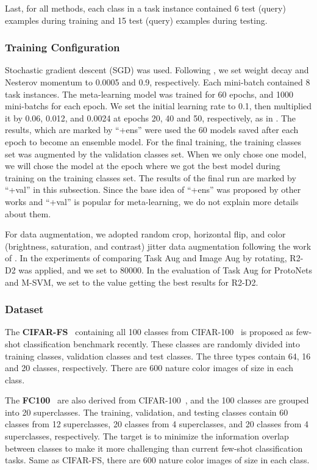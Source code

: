 \documentclass[10pt,twocolumn,letterpaper]{article}
\begin{document}
Last, for all methods, each class in a task instance contained 6 test (query) examples during training and 15 test (query) examples during testing.

\subsubsection{Training Configuration}
Stochastic gradient descent (SGD) was used. Following \cite{sutskever2013importance}, we set weight decay and Nesterov momentum to 0.0005 and 0.9, respectively. Each mini-batch contained 8 task instances. The meta-learning model was trained for 60 epochs, and 1000 mini-batchs for each epoch. We set the initial learning rate to 0.1, then multiplied it by 0.06, 0.012, and 0.0024 at epochs 20, 40 and 50, respectively, as in \cite{gidaris2018dynamic}. The results, which are marked by ``+ens'' were used the 60 models saved after each epoch to become an ensemble model. For the final training, the training classes set was augmented by the validation classes set. When we only chose one model, we will chose the model at the epoch where we got the best model during training on the training classes set. The results of the final run are marked by ``+val'' in this subsection. Since the base idea of ``+ens'' was proposed by other works and ``+val'' is popular for meta-learning, we do not explain more details about them.

For data augmentation, we adopted random crop, horizontal flip, and color (brightness, saturation, and contrast) jitter data augmentation following the work of \cite{gidaris2018dynamic,qiao2018few}. In the experiments of comparing Task Aug and Image Aug by rotating, R2-D2 was applied, and we set  to 80000. In the evaluation of Task Aug for ProtoNets and M-SVM, we set  to the value getting the best results for R2-D2.



\subsubsection{Dataset}
The \textbf{CIFAR-FS}~\cite{bertinetto2018meta} containing all 100 classes from CIFAR-100~\cite{krizhevsky2010cifar} is proposed as few-shot classification benchmark recently. These classes are randomly divided into training classes, validation classes and test classes. The three types contain 64, 16 and 20 classes, respectively. There are 600 nature color images of size  in each class.

The \textbf{FC100}~\cite{oreshkin2018tadam} are also derived from CIFAR-100~\cite{krizhevsky2010cifar}, and the 100 classes are grouped into 20 superclasses. The training, validation, and testing classes contain 60 classes from 12 superclasses, 20 classes from 4 superclasses, and 20 classes from 4 superclasses, respectively. The target is to minimize the information overlap between classes to make it more challenging than current few-shot classification tasks. Same as CIFAR-FS, there are 600 nature color images of size  in each class.
\end{document}
